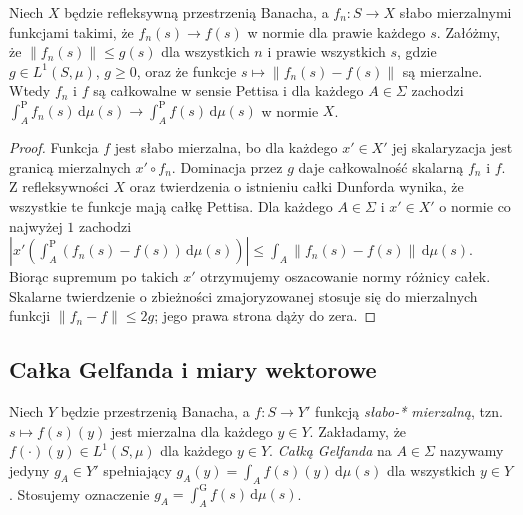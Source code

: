 \begin{twierdzenie}
\label{thm:pettis-convergence15b}
Niech $X$ będzie refleksywną przestrzenią Banacha, a
$f_n:S\to X$ słabo mierzalnymi funkcjami takimi, że
$f_n(s)\to f(s)$ w normie dla prawie każdego $s$.
Załóżmy, że $\|f_n(s)\|\le g(s)$ dla wszystkich $n$
i prawie wszystkich $s$, gdzie $g\in L^1(S,\mu)$,
$g\ge0$, oraz że funkcje
$s\mapsto\|f_n(s)-f(s)\|$ są mierzalne.
Wtedy $f_n$ i $f$ są całkowalne w sensie Pettisa i dla
każdego $A\in\Sigma$ zachodzi
$\int_A^{\mathrm P}f_n(s)\,\mathrm d\mu(s)
\to\int_A^{\mathrm P}f(s)\,\mathrm d\mu(s)$ w normie $X$.
\end{twierdzenie}
\begin{proof}
Funkcja $f$ jest słabo mierzalna, bo dla każdego $x'\in X'$
jej skalaryzacja jest granicą mierzalnych $x'\circ f_n$.
Dominacja przez $g$ daje całkowalność skalarną $f_n$ i $f$.
Z refleksywności $X$ oraz twierdzenia o istnieniu całki
Dunforda wynika, że wszystkie te funkcje mają całkę Pettisa.
Dla każdego $A\in\Sigma$ i $x'\in X'$ o normie co najwyżej
$1$ zachodzi
$|x'(\int_A^{\mathrm P}(f_n(s)-f(s))\,\mathrm d\mu(s))|
\le\int_A\|f_n(s)-f(s)\|\,\mathrm d\mu(s)$.
Biorąc supremum po takich $x'$ otrzymujemy oszacowanie
normy różnicy całek. Skalarne twierdzenie o zbieżności
zmajoryzowanej stosuje się do mierzalnych funkcji
$\|f_n-f\|\le2g$; jego prawa strona dąży do zera.
\end{proof}

\subsection{Całka Gelfanda i miary wektorowe}

\begin{definicja}
\label{def:gelfand15b}
Niech $Y$ będzie przestrzenią Banacha, a
$f:S\to Y'$ funkcją \emph{słabo-* mierzalną}, tzn.
$s\mapsto f(s)(y)$ jest mierzalna dla każdego $y\in Y$.
Zakładamy, że $f(\cdot)(y)\in L^1(S,\mu)$ dla każdego
$y\in Y$. \emph{Całką Gelfanda} na $A\in\Sigma$ nazywamy
jedyny $g_A\in Y'$ spełniający
$g_A(y)=\int_Af(s)(y)\,\mathrm d\mu(s)$ dla wszystkich
$y\in Y$. Stosujemy oznaczenie
$g_A=\int_A^{\mathrm G}f(s)\,\mathrm d\mu(s)$.
\end{definicja}

